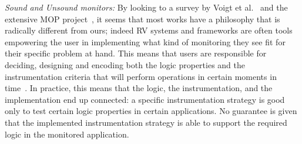 

\newcommand\sepItems{\saveSpace\saveSpace\saveSpace\\*${}_{}$\\*${}_{}\,\bullet\,$}

\noindent\textit{Sound and Unsound monitors:}
By looking to a survey by Voigt et al.~\cite{Voigt2013} and the extensive MOP project~\cite{meredith2012overview},
it seems that most  works have a philosophy that is radically different from ours;
indeed RV systems and frameworks are often tools empowering the user
in implementing what kind of monitoring they see fit for their specific problem at hand.
This means that users are responsible for deciding, designing and encoding both the 
logic properties and the instrumentation criteria that will perform operations
in certain moments in time~\cite{meredith2012overview}.
In practice, this means that the logic, the instrumentation, and the implementation end up connected:
a specific instrumentation strategy is good only to test certain logic properties in certain applications.
No guarantee is given that the implemented instrumentation strategy is able to support
the required logic in the monitored application.

%
%

